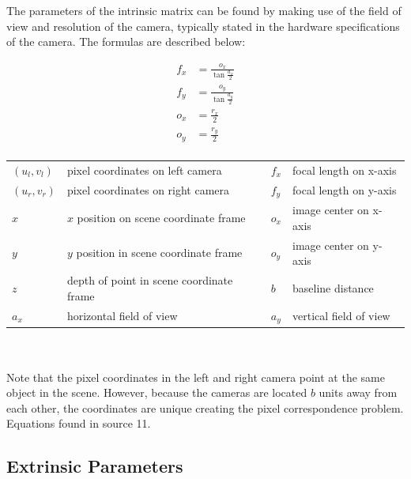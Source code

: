\documentclass[11pt]{scrartcl}
\begin{document}
The parameters of the intrinsic matrix can be found by making use of the field of view and resolution of the camera, typically stated in the hardware specifications of the camera. The 
formulas are described below: 

\begin{theorem}

  \begin{align}
      f_x & = \displaystyle\frac{o_x}{\tan{\displaystyle\frac{a_x}{2}}} \\
    f_y & = \displaystyle\frac{o_y}{\tan{\displaystyle\frac{a_y}{2}}}  \\
    o_x & = \displaystyle\frac{r_x}{2} \\ 
    o_y & = \displaystyle\frac{r_y}{2} \\ 
  \end{align}

  \begin{figurekey}
    \begin{tabular}{llll}
      $(u_l,v_l)$ & pixel coordinates on left camera     & $f_x$ & focal length on x-axis \\
      $(u_r,v_r)$ & pixel coordinates on right camera   & $f_y$ & focal length on y-axis \\
      $x$     & $x$ position on scene coordinate frame  & $o_x$ & image center on x-axis \\
      $y$     & $y$ position in scene coordinate frame   & $o_y$ & image center on y-axis \\
        $z$     & depth of point in scene coordinate frame  &$b$ & baseline distance \\
        $a_x$ & horizontal field of view & $a_y$ & vertical field of view \\   
    \end{tabular}
  \end{figurekey} \\ \\
    Note that the pixel coordinates in the left and right camera point at the same object in 
    the scene. However, because the cameras are located $b$ units away from each other, 
    the coordinates are unique creating the pixel correspondence problem. Equations found in source 11.
\end{theorem}



\subsection{Extrinsic Parameters}
\end{document}
